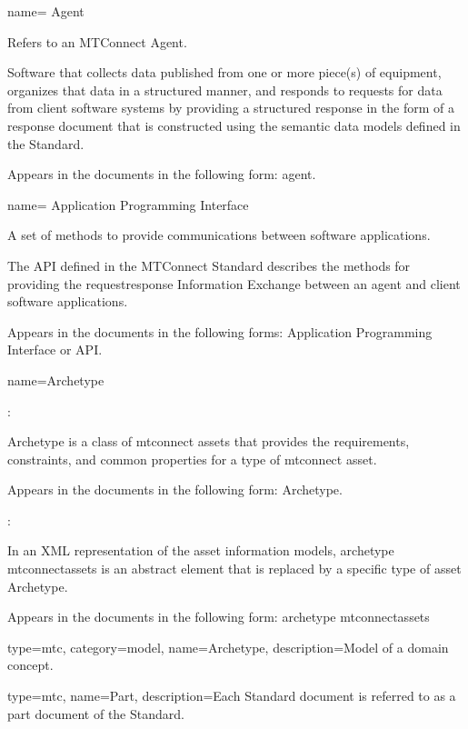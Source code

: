 {
  name= {Agent}
}
{
  Refers to an MTConnect Agent. 
  
  Software that collects data published from one or more piece(s) of equipment, organizes that data in a structured manner, and responds to requests for data from client software systems by providing a structured response in the form of a \gls{response document} that is constructed using the \glspl{semantic data model} defined in the Standard. 
  
  Appears in the documents in the following form: \gls{agent}.
}


{
  name= {Application Programming Interface}
}
{
  A set of methods to provide communications between software applications.

  The API defined in the MTConnect Standard describes the methods for providing the \gls{requestresponse} Information Exchange between an \gls{agent} and client software applications.
  
  Appears in the documents in the following forms: Application Programming Interface or API.
}


{
  name={Archetype}
}
{
  :
  
  Archetype is a class of \glspl{mtconnect asset} that provides the requirements, constraints, and common properties for a type of \gls{mtconnect asset}.

  Appears in the documents in the following form: Archetype.

  :
  
  In an XML representation of the \glspl{asset information model}, \gls{archetype mtconnectassets} is an abstract element that is replaced by a specific type of \gls{asset} Archetype.
  
  Appears in the documents in the following form: \gls{archetype mtconnectassets}
}


{
  type=mtc,
  category=model,
  name={Archetype},
  description={Model of a domain concept.}
}

{
  type=mtc,
  name={Part},
  description={Each Standard document is referred to as a \gls{part document} of the Standard.}
}


